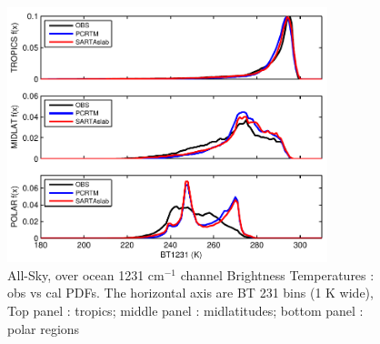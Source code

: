 \documentclass[agupp]{aguplus}              %
\newcommand{\wn}{cm$^{-1}$\xspace}
\begin{document}
\begin{article}
\begin{figure}[h]
\noindent\includegraphics[width=22pc]{FIGS/ecm_cloudBT1231_gev_trop_midlat_poles}
\caption{All-Sky, over ocean 1231 \wn channel Brightness Temperatures : obs vs cal PDFs. 
The horizontal axis are BT 231 bins (1 K wide), Top panel : tropics; middle panel : midlatitudes; bottom panel : polar regions}
\label{bt1231_night_allsky_ocean_trop_midlat_poles}
\end{figure}


\end{article}
\end{document}
